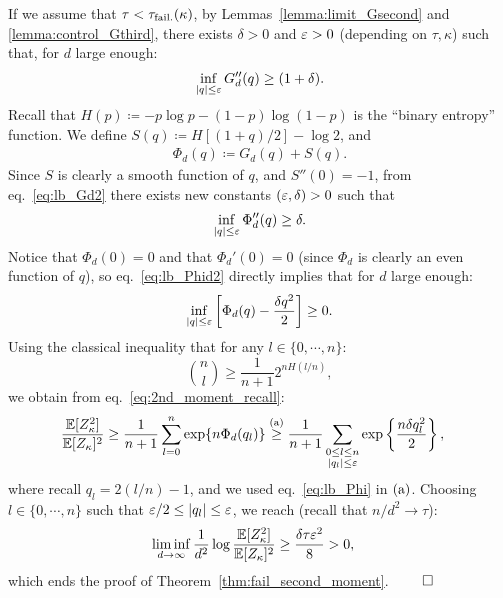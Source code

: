 \myskip
If we assume that $\tau < \tau_{\rm fail.}(\kappa)$, by  Lemmas~\ref{lemma:limit_Gsecond} and \ref{lemma:control_Gthird}, there exists 
$\delta > 0$ and $\varepsilon > 0$ (depending on $\tau, \kappa$) such that, for $d$ large enough: 
\begin{equation}\label{eq:lb_Gd2}
    \inf_{|q| \leq \varepsilon} G_d''(q) \geq (1+\delta).
\end{equation}
Recall that $H(p) \coloneqq - p \log p - (1-p)\log (1-p)$ is the ``binary entropy'' function. We define $S(q) \coloneqq H[(1+q)/2] - \log 2$, 
and
\begin{align}\label{eq:def_Phid}
    \Phi_d(q) \coloneqq G_d(q) + S(q).
\end{align}
Since $S$ is clearly a smooth function of $q$, and $S''(0) = -1$, from eq.~\eqref{eq:lb_Gd2} there exists new constants $(\varepsilon, \delta) > 0$ 
such that
\begin{equation}\label{eq:lb_Phid2}
    \inf_{|q| \leq \varepsilon} \Phi_d''(q) \geq \delta.
\end{equation}
Notice that $\Phi_d(0) = 0$ and that $\Phi_d'(0) = 0$ (since $\Phi_d$ is clearly an even function of $q$), so eq.~\eqref{eq:lb_Phid2} directly implies 
that for $d$ large enough: 
\begin{equation}\label{eq:lb_Phi}
     \inf_{|q| \leq \varepsilon}\left[\Phi_d(q) - \frac{\delta q^2}{2}\right] \geq 0.
\end{equation}
Using the classical inequality that for any $l \in \{0, \cdots, n\}$:
\begin{equation*}
   \binom{n}{l} \geq \frac{1}{n+1} 2^{n H(l/n)},
\end{equation*}
we obtain from eq.~\eqref{eq:2nd_moment_recall}:
\begin{align*}
    \frac{\mathbb{E}[Z_\kappa^2]}{\mathbb{E}[Z_\kappa]^2} &\geq \frac{1}{n+1} \sum_{l=0}^n \exp\{n \Phi_d(q_l)\} \overset{\mathrm{(a)}}{\geq} \frac{1}{n+1} \sum_{\substack{0 \leq l \leq n \\ |q_l| \leq \varepsilon}} \exp\left\{\frac{n\delta q_l^2}{2}\right\},
\end{align*}
where recall $q_l = 2 (l/n) - 1$, and we used eq.~\eqref{eq:lb_Phi} in $(\rm a)$.
Choosing $l \in \{0, \cdots, n\}$ such that $\varepsilon/2 \leq |q_l| \leq \varepsilon$, we reach (recall that $n/d^2 \to \tau$):
\begin{align*}
    \liminf_{d \to \infty} \frac{1}{d^2} \log \frac{\mathbb{E}[Z_\kappa^2]}{\mathbb{E}[Z_\kappa]^2} &\geq \frac{\delta \tau \varepsilon^2}{8} > 0, 
\end{align*}
which ends the proof of Theorem~\ref{thm:fail_second_moment}. $\qed$

